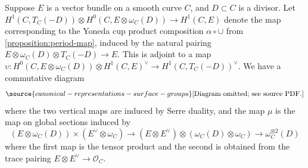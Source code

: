 \begin{lemma}
\notready
	\label{lemma:multiplication-map}
	Suppose $E$ is a vector bundle on a smooth curve $C$, and $D \subset C$
	is a divisor.
	Let $H^1(C, T_C(-D)) \otimes H^0(C, E \otimes \omega_C(D)) \to H^1(C, E)$
	denote the map corresponding to the Yoneda cup product composition $\alpha \circ \cup$
	from \autoref{proposition:period-map},
	induced by the natural pairing $E \otimes \omega_C(D) \otimes T_C(-D) \to E$.
This is adjoint to a map $\upsilon: H^0(C, E \otimes \omega_C(D)) \otimes
	H^1(C, E)^\vee \to H^1(C, T_C(-D))^\vee$.
	We have a commutative diagram
	\begin{equation}
		\label{equation:serre-dual-diagram}
\source{canonical-representations-surface-groups}
		\text{[Diagram omitted; see source PDF.]}\end{equation}
	where the two vertical maps are induced by Serre duality, and the
	map $\mu$ is the map on global sections induced by $$(E
	\otimes \omega_C(D)) \times (E^\vee \otimes \omega_C) \to (E \otimes E^\vee)
	\otimes (\omega_C(D) \otimes \omega_C) \to \omega_C^{\otimes 2}(D)$$
	where the first map is the tensor product and the second is obtained from the trace pairing $E\otimes E^\vee\to \mathscr{O}_C$.
\end{lemma}
